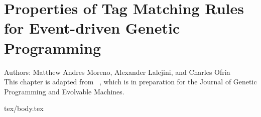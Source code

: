 \chapter{Properties of Tag Matching Rules for Event-driven Genetic Programming}
\label{ch:tag-matching}

\noindent
Authors: Matthew Andres Moreno, Alexander Lalejini, and Charles Ofria \\
This chapter is adapted from ~\citep{moreno2021matchmaker}, which is in preparation for the Journal of Genetic Programming and Evolvable Machines.

{tex/body.tex}
